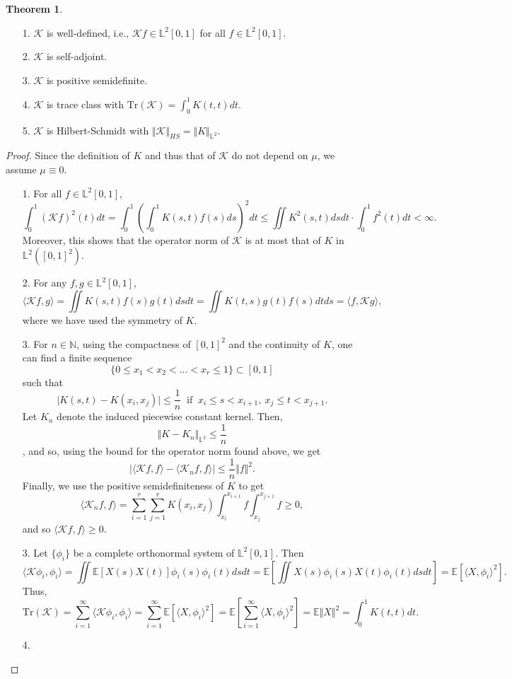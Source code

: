 \documentclass[10pt, a4paper]{report}
\newcommand{\E}[0]{\mathbb{E}}
\newcommand{\N}[0]{\mathbb{N}}
\newcommand{\Ll}[0]{\mathbb{L}}
\newcommand{\K}[0]{\mathcal{K}}
\theoremstyle{definition}
\newtheorem{theorem}{Theorem}
\theoremstyle{remark}
\begin{document}
\begin{theorem}
	\begin{itemize}
		\item[]
		\item[1.] $\K$ is well-defined, i.e., $\K f \in \Ll^2[0,1]$ for all $f\in \Ll^2[0,1]$.
		\item[2.] $\K$ is self-adjoint.
		\item[3.] $\K$ is positive semidefinite.
		\item[4.] $\K$ is trace class with $\mathrm{Tr}(\K)=\int_{0}^{1}K(t,t)dt$.
		\item[5.] $\K$ is Hilbert-Schmidt with $\Vert \K \Vert_{HS} = \Vert K \Vert_{\Ll^2}$.
	\end{itemize}
	\begin{proof}
		Since the definition of $K$ and thus that of $\K$ do not depend on $\mu$, we assume $\mu \equiv 0$.
		\begin{itemize}
			\item[1.] For all $f \in \Ll^2[0,1]$, 
			$$\int_{0}^{1}(\K f)^2(t)dt = \int_{0}^{1}\left(\int_{0}^{1}K(s,t)f(s)ds\right)^2dt \leq \iint K^2(s,t)dsdt \cdot \int_{0}^1 f^2(t)dt < \infty.$$
			Moreover, this shows that the operator norm of $\K$ is at most that of $K$ in $\Ll^2([0,1]^2)$.
			\item[2.] For any $f,g \in \Ll^2[0,1]$, 
			$$\langle \K f,g \rangle = \iint K(s,t)f(s)g(t)dsdt = \iint K(t,s)g(t)f(s)dtds = \langle f,\K g \rangle,$$
			where we have used the symmetry of $K$.
			\item[3.] For $n\in \N$, using the compactness of $[0,1]^2$ and the continuity of $K$, one can find a finite sequence 
			$$\{0\leq x_1 <  x_2< ...< x_r \leq 1\} \subset [0,1]$$
			such that 
			$$\vert K(s,t) - K(x_i,x_j)\vert \leq \frac{1}{n} \ \text{ if } \ x_i\leq s<x_{i+1}, \ x_j\leq t<x_{j+1}.$$
			Let $K_n$ denote the induced piecewise constant kernel. Then, $$\Vert K-K_n \Vert_{\Ll^2}\leq \frac{1}{n}$$, and so, using the bound for the operator norm found above, we get 
			$$\vert \langle \K f,f \rangle - \langle \K_n f,f \rangle\vert \leq \frac{1}{n}\Vert f\Vert^2.$$
			Finally, we use the positive semidefiniteness of $K$ to get
			$$\langle \K_n f,f \rangle = \sum_{i=1}^{r}\sum_{j=1}^{r} K(x_i,x_j) \int_{x_i}^{x_{i+1}}\! f \int_{x_j}^{x_{j+1}}\!f \geq 0,$$
			and so $\langle \K f,f \rangle\geq 0$.
			\item[3.] Let $\{\phi_i\}$ be a complete orthonormal system of $\Ll^2[0,1]$. Then
			$$\langle \K \phi_i,\phi_i \rangle = \iint \E[X(s)X(t)]\phi_i(s)\phi_i(t)dsdt = \E\left[\iint X(s)\phi_i(s)X(t)\phi_i(t)dsdt\right] = \E[\langle X,\phi_i\rangle^2].$$
			Thus, 
			$$\mathrm{Tr}(\K) = \sum_{i=1}^{\infty} \langle \K \phi_i,\phi_i\rangle = \sum_{i=1}^{\infty} \E[\langle X,\phi_i\rangle^2] = \E\left[\sum_{i=1}^{\infty} \langle X,\phi_i\rangle^2\right] = \E\Vert X \Vert^2 = \int_{0}^{1}K(t,t)dt.$$
			\item[4.] 
		\end{itemize}
	\end{proof}
\end{theorem}
\end{document}
